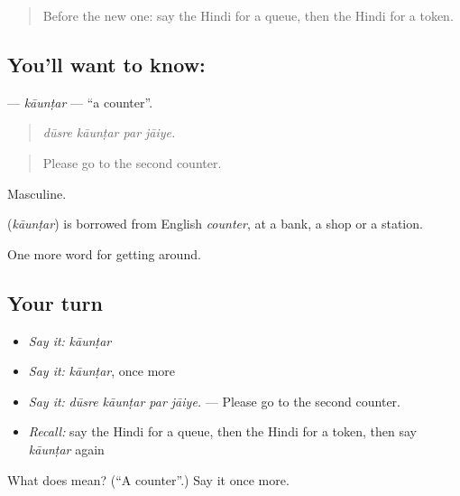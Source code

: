 \begin{quote}
Before the new one: say the Hindi for a queue, then the Hindi for a token.
\end{quote}

\subsection*{You'll want to know: }
\textbf{} — \emph{kāunṭar} — \textquotedblleft{}a counter\textquotedblright{}.

\begin{quote}
   
\end{quote}

\begin{quote}
\emph{dūsre kāunṭar par jāiye.}
\end{quote}

\begin{quote}
Please go to the second counter.
\end{quote}

Masculine.

\begin{cousinweb}
\textbf{} (\emph{kāunṭar}) is borrowed from English \emph{counter}, at a bank, a shop or a station.
\end{cousinweb}

\begin{grammarlens}[title={What you've built}]
One more word for getting around.
\end{grammarlens}

\subsection*{Your turn}
\begin{itemize}
\raggedright
  \item \emph{Say it:} \emph{kāunṭar}
  \item \emph{Say it:} \emph{kāunṭar}, once more
  \item \emph{Say it:} \emph{dūsre kāunṭar par jāiye.} — Please go to the second counter.
  \item \emph{Recall:} say the Hindi for a queue, then the Hindi for a token, then say \emph{kāunṭar} again
\end{itemize}

\begin{tcolorbox}[breakable,colback=teal!4,colframe=teal!35!black,title={Before you move on}]
What does  mean? (\textquotedblleft{}A counter\textquotedblright{}.) Say it once more.
\end{tcolorbox}
